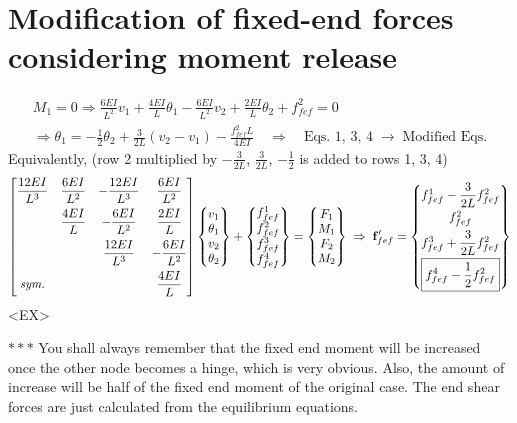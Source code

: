 \section{Modification of fixed-end forces considering moment release}
\begin{fig}
  
\end{fig}
\begin{gather*}
  M_1 = 0 \Rightarrow \frac{6EI}{L^2}v_1 + \frac{4EI}{L}\theta_1 - \frac{6EI}{L^2}v_2 + \frac{2EI}{L}\theta_2 + f^2_{fef} = 0\\
  \Rightarrow \theta_1 = -\frac12\theta_2 + \frac{3}{2L}(v_2 - v_1) - \frac{f^2_{fef}L}{4EI}\quad\Rightarrow\quad\text{Eqs.\ 1, 3, 4}\;\rightarrow\;\text{Modified Eqs.}
\end{gather*}
Equivalently, (row 2 multiplied by $-\frac{3}{2L}$, $\frac{3}{2L}$, $-\frac12$ is added to rows 1, 3, 4)
{\small\begin{equation*}
  \begin{bmatrix}
    \dfrac{12EI}{L^3} & \dfrac{6EI}{L^2} & -\dfrac{12EI}{L^3} & \dfrac{6EI}{L^2}\\[8pt]
    & \dfrac{4EI}{L} & -\dfrac{6EI}{L^2} & \dfrac{2EI}{L}\\[8pt]
    & & \dfrac{12EI}{L^3} & -\dfrac{6EI}{L^2}\\[8pt]
    \textit{sym.} & & & \dfrac{4EI}{L}
  \end{bmatrix}\begin{Bmatrix}v_1\\ \theta_1\\ v_2\\ \theta_2\end{Bmatrix} + \begin{Bmatrix}f^1_{fef}\\ f^2_{fef}\\ f^3_{fef}\\ f^4_{fef}\end{Bmatrix} = \begin{Bmatrix}F_1\\ M_1\\ F_2\\ M_2\end{Bmatrix}
  \;\Rightarrow\; \mathbf{f}_{fef}' = \begin{Bmatrix}f^1_{fef} - \dfrac{3}{2L}f^2_{fef}\\[6pt] f^2_{fef}\\[4pt] f^3_{fef} + \dfrac{3}{2L}f^2_{fef}\\[6pt] \boxed{f^4_{fef} - \dfrac12 f^2_{fef}}\end{Bmatrix}
\end{equation*}
}
\textless EX\textgreater
\begin{fig}
  
\end{fig}
\noindent$***$ You shall always remember that the fixed end moment will be increased once the other node becomes a hinge, which is very obvious. Also, the amount of increase will be half of the fixed end moment of the original case. The end shear forces are just calculated from the equilibrium equations.

